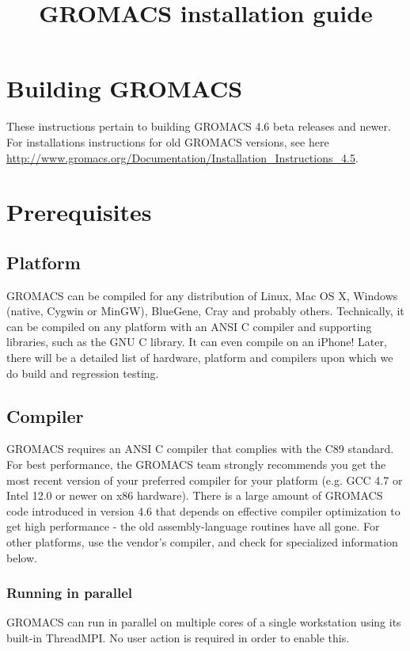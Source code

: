 \documentclass{article}[12pt,a4paper,twoside]
\title{GROMACS installation guide}
\newcommand{\gromacs}{GROMACS}
\newcommand{\threadmpi}{ThreadMPI}
\begin{document}
\section{Building GROMACS}
These instructions pertain to building \gromacs{} 4.6 beta releases
and newer. For installations instructions for old \gromacs{} versions,
see here
\url{http://www.gromacs.org/Documentation/Installation_Instructions_4.5}.

\section{Prerequisites}

\subsection{Platform}

\gromacs{} can be compiled for any distribution of Linux, Mac OS X,
Windows (native, Cygwin or MinGW), BlueGene, Cray and probably others.
Technically, it can be compiled on any platform with an ANSI C
compiler and supporting libraries, such as the GNU C library. It can
even compile on an iPhone! Later, there will be a detailed list of
hardware, platform and compilers upon which we do build and regression
testing.

\subsection{Compiler}

\gromacs{} requires an ANSI C compiler that complies with the C89
standard. For best performance, the \gromacs{} team strongly
recommends you get the most recent version of your preferred compiler
for your platform (e.g. GCC 4.7 or Intel 12.0 or newer on x86
hardware). There is a large amount of \gromacs{} code introduced in
version 4.6 that depends on effective compiler optimization to get
high performance - the old assembly-language routines have all
gone. For other platforms, use the vendor's compiler, and check for
specialized information below.

\subsubsection{Running in parallel}

\gromacs{} can run in parallel on multiple cores of a single
workstation using its built-in \threadmpi. No user action is required
in order to enable this.
\end{document}
